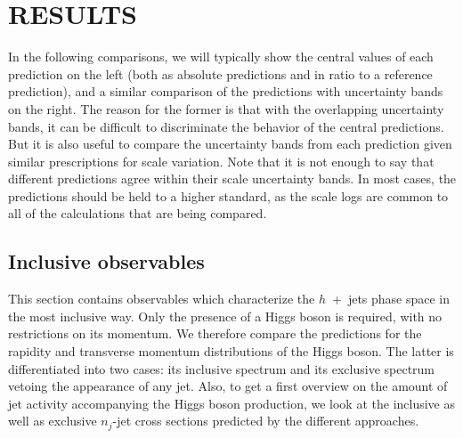 \section{RESULTS}
\label{sec:hjetscomp:results}

In the following comparisons, we will typically show the central
values of each prediction on the left (both as absolute predictions
and in ratio to a reference prediction), and a similar comparison of
the predictions with uncertainty bands on the right. The reason for
the former is that with the overlapping uncertainty bands, it can be
difficult to discriminate the behavior of the central predictions. But
it is also useful to compare the uncertainty bands from each
prediction given similar prescriptions for scale variation.  Note that
it is not enough to say that different predictions agree within their
scale uncertainty bands. In most cases, the predictions should be held
to a higher standard, as the scale logs are common to all of the
calculations that are being compared.








\subsection{Inclusive observables}
\label{sec:hjetscomp:results:inclobs}

This section contains observables which characterize the
$h$~+~jets phase space in the most inclusive way. Only the presence 
of a Higgs boson is required, with no restrictions on its momentum. 
We therefore compare 
the predictions for the rapidity and transverse momentum distributions 
of the Higgs boson. The latter is differentiated into two cases: its 
inclusive spectrum and its exclusive spectrum vetoing the appearance 
of any jet. Also, to get a first overview on the amount of jet activity 
accompanying the Higgs boson production, we look at the inclusive as 
well as exclusive $n_j$-jet cross sections predicted by the different 
approaches.

